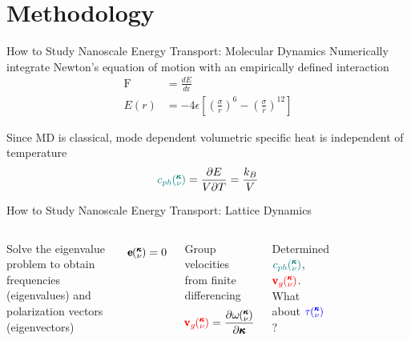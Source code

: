 \documentclass{beamer}
\newcommand{\kv}{\mspace{-4.0mu}\left(\mspace{-8.0mu}
\begin{smallmatrix}&\pmb{\kappa} \\&\nu\end{smallmatrix}
\mspace{-3.0mu}\right)}
\begin{document}
\section{Methodology}
\begin{frame}{How to Study Nanoscale Energy Transport: Molecular Dynamics}
Numerically integrate Newton's equation of motion with an empirically defined interaction
\begin{equation}
\begin{split}
\pmb{\mathrm{F}}&=\frac{dE}{d\pmb{\mathrm{r}}}\\
E(r)&=-4\epsilon\left[\left(\frac{\sigma}{r}\right)^6-\left(\frac{\sigma}{r}\right)^{12}\right]
\end{split}
\end{equation}

Since MD is classical, mode dependent volumetric specific heat is independent of temperature
\begin{equation}\label{EQ:Cph}
\textcolor{teal}{c_{ph}\kv}=\frac{\partial E}{V\partial T}=\frac{k_B}{V}	
\end{equation}
\end{frame}

\begin{frame}{How to Study Nanoscale Energy Transport: Lattice Dynamics}
\begin{columns}

Solve the eigenvalue problem to obtain frequencies (eigenvalues) and polarization vectors (eigenvectors)

\begin{equation}
[D(\pmb{\kappa})-I\omega^2\kv]\pmb{\mathrm{e}}\kv = 0
\end{equation}

Group velocities from finite differencing
\begin{equation}\label{EQ:NMD:vg}
\begin{split}
\textcolor{red}{\pmb{\mathrm{v}}_{g}\kv}=\frac{\partial \omega \kv}{\partial \pmb{\kappa}}
\end{split}
\end{equation}

Determined $\textcolor{teal}{c_{ph}\kv}$, $\textcolor{red}{\pmb{\mathrm{v}}_{g}\kv}$. What about $\textcolor{blue}{\tau\kv}$?
\begin{figure}[t]
\begin{center}
\vspace*{-0.8cm}
\renewcommand{\figure}{Fig.}
\label{fig:bulk_dis_dos}
\end{center}
\end{figure}
\end{columns}

\end{frame}
\end{document}
